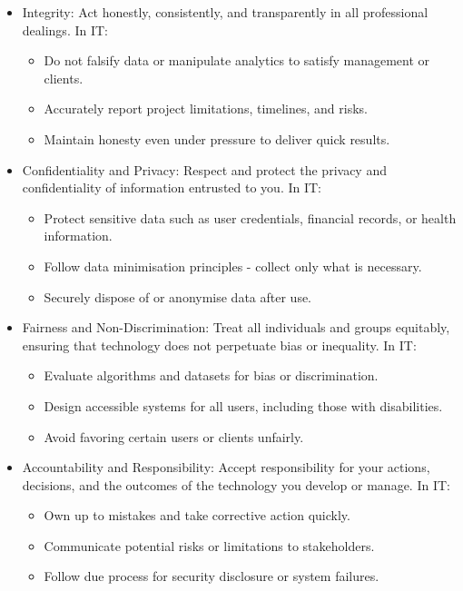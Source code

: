\begin{itemize}
    \item Integrity: Act honestly, consistently, and transparently in all professional dealings. In IT:
        \begin{itemize}
            \item Do not falsify data or manipulate analytics to satisfy management or clients.
            \item Accurately report project limitations, timelines, and risks.
            \item Maintain honesty even under pressure to deliver quick results.
        \end{itemize}
    \item Confidentiality and Privacy: Respect and protect the privacy and confidentiality of information entrusted to you. In IT:
        \begin{itemize}
            \item Protect sensitive data such as user credentials, financial records, or health information.
            \item Follow data minimisation principles - collect only what is necessary.
            \item Securely dispose of or anonymise data after use.
        \end{itemize}
    \item Fairness and Non-Discrimination: Treat all individuals and groups equitably, ensuring that technology does not perpetuate bias or inequality. In IT:
        \begin{itemize}
            \item Evaluate algorithms and datasets for bias or discrimination.
            \item Design accessible systems for all users, including those with disabilities.
            \item Avoid favoring certain users or clients unfairly.
        \end{itemize}
    \item Accountability and Responsibility: Accept responsibility for your actions, decisions, and the outcomes of the technology you develop or manage. In IT:
        \begin{itemize}
            \item Own up to mistakes and take corrective action quickly.
            \item Communicate potential risks or limitations to stakeholders.
            \item Follow due process for security disclosure or system failures.

\end{itemize}
\end{itemize}
